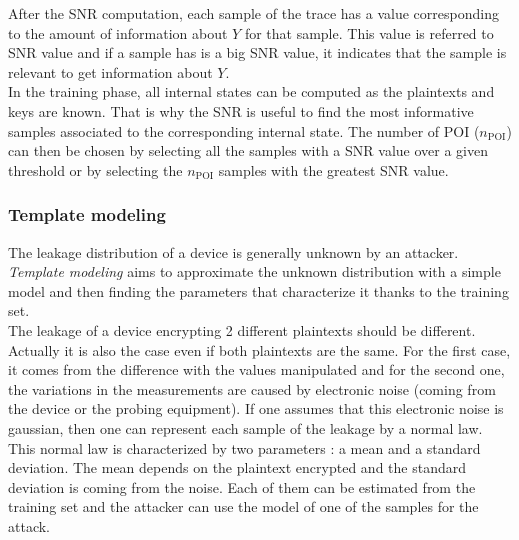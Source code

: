 After the SNR computation, each sample of the trace has a value 
corresponding to the amount of information about $Y$ for that sample. This 
value is referred to SNR value and if a sample has is a big SNR value, it 
indicates that the sample is relevant to get information about $Y$.\\

In the training phase, all internal states can be computed as the 
plaintexts and keys are known. That is why the SNR is useful to find the 
most informative samples associated to the corresponding internal state. 
The number of POI ($n_{\text{POI}}$) can then be chosen by selecting all 
the samples with a SNR value over a given threshold or by selecting the 
$n_{\text{POI}}$ samples with the greatest SNR value.  
\subsubsection{Template modeling}
The leakage distribution of a device is generally unknown by an attacker. 
\textit{Template modeling} aims to
approximate the unknown distribution with a simple model and then finding 
the parameters that characterize it thanks to the
training set.\\

The leakage of a device encrypting 2 different plaintexts should be 
different. Actually it is also the case even if both plaintexts are the 
same. For the first case, it comes from the difference with the values 
manipulated and for the second one, the variations in the measurements are 
caused by electronic noise (coming from the device or the probing 
equipment). If one assumes that this electronic noise is gaussian, then 
one can represent each sample of the leakage by a normal law. This normal 
law is characterized by two parameters : a mean and a standard deviation. 
The mean depends on the plaintext encrypted and the standard deviation is 
coming from the noise. Each of them can be estimated from the training set 
and the attacker can use the model of one of the samples for the attack.\\

